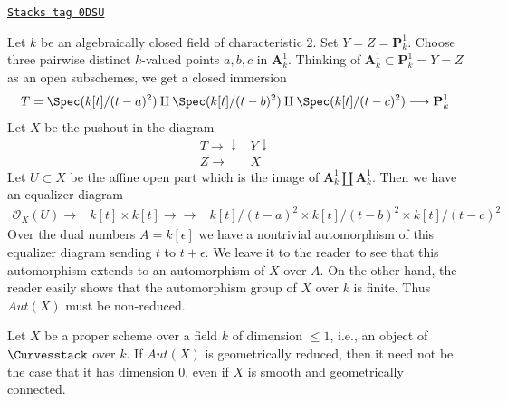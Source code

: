 \begin{example}

\label{moduli-curves-example-non-reduced}
\href{https://stacks.math.columbia.edu/tag/0DSU}{\texttt{Stacks tag 0DSU}}

Let $k$ be an algebraically closed field of characteristic $2$.
Set $Y = Z = \mathbf{P}^1_k$. Choose three pairwise distinct $k$-valued points
$a, b, c$ in $\mathbf{A}^1_k$. Thinking of
$\mathbf{A}^1_k \subset \mathbf{P}^1_k = Y = Z$ as an open subschemes,
we get a closed immersion
$$
T =  \Spec(k[t]/(t - a)^2) \amalg \Spec(k[t]/(t - b)^2)
\amalg \Spec(k[t]/(t - c)^2)
\longrightarrow
\mathbf{P}^1_k
$$
Let $X$ be the pushout in the diagram
$$
\begin{array}{cc}T \longrightarrow\downarrow & Y \downarrow \\ Z \longrightarrow & X\end{array}
$$
Let $U \subset X$ be the affine open part which is the image of
$\mathbf{A}^1_k \amalg \mathbf{A}^1_k$. Then we have an equalizer
diagram
$$
\begin{array}{ccc}\mathcal{O}_X(U) \longrightarrow & k[t] \times k[t] \longrightarrow\longrightarrow & k[t]/(t - a)^2 \times k[t]/(t - b)^2 \times k[t]/(t - c)^2\end{array}
$$
Over the dual numbers $A = k[\epsilon]$ we have a nontrivial automorphism
of this equalizer diagram sending $t$ to $t + \epsilon$. We leave it to the
reader to see that this automorphism extends to an automorphism of $X$
over $A$. On the other hand, the reader easily shows that the
automorphism group of $X$ over $k$ is finite.
Thus $\mathit{Aut}(X)$ must be non-reduced.
\end{example}

Let $X$ be a proper scheme over a field $k$ of dimension $\leq 1$, i.e.,
an object of $\Curvesstack$ over $k$. If $\mathit{Aut}(X)$
is geometrically reduced, then it need not be the case that
it has dimension $0$, even if $X$ is smooth and geometrically connected.

